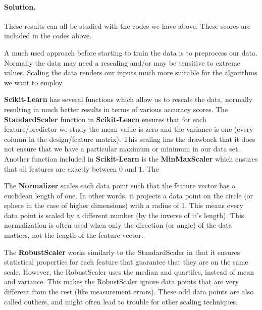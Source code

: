 \documentclass[%
oneside,                 %
final,                   %
10pt]{article}
\newenvironment{doconceexercise}{}{}
\newcounter{doconceexercisecounter}
\begin{document}
\begin{doconceexercise}
\paragraph{Solution.}
These results can all be studied with the codes we have above. These scores are included in the codes above.



\end{doconceexercise}




\begin{doconceexercise}



A much used approach before starting to train the data is  to preprocess our
data. Normally the data may need a rescaling and/or may be sensitive
to extreme values. Scaling the data renders our inputs much more
suitable for the algorithms we want to employ.

\textbf{Scikit-Learn} has several functions which allow us to rescale the
data, normally resulting in much better results in terms of various
accuracy scores.  The \textbf{StandardScaler} function in \textbf{Scikit-Learn}
ensures that for each feature/predictor we study the mean value is
zero and the variance is one (every column in the design/feature
matrix).  This scaling has the drawback that it does not ensure that
we have a particular maximum or minimum in our data set. Another
function included in \textbf{Scikit-Learn} is the \textbf{MinMaxScaler} which
ensures that all features are exactly between $0$ and $1$. The


The \textbf{Normalizer} scales each data
point such that the feature vector has a euclidean length of one. In other words, it
projects a data point on the circle (or sphere in the case of higher dimensions) with a
radius of 1. This means every data point is scaled by a different number (by the
inverse of it’s length).
This normalization is often used when only the direction (or angle) of the data matters,
not the length of the feature vector.

The \textbf{RobustScaler} works similarly to the StandardScaler in that it
ensures statistical properties for each feature that guarantee that
they are on the same scale. However, the RobustScaler uses the median
and quartiles, instead of mean and variance. This makes the
RobustScaler ignore data points that are very different from the rest
(like measurement errors). These odd data points are also called
outliers, and might often lead to trouble for other scaling
techniques.



\end{doconceexercise}
\end{document}
